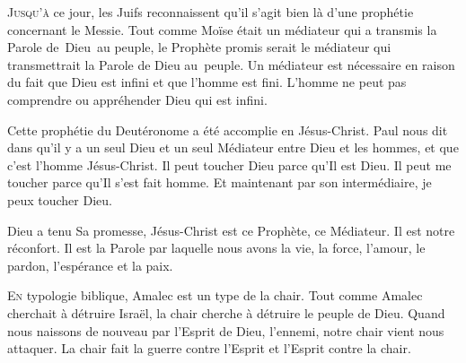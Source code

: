 \lettrine{J}{usqu'à} ce jour, les Juifs reconnaissent
 qu'il s'agit bien là d'une prophétie concernant le Messie.
 Tout comme Moïse était un médiateur qui a transmis la Parole de~Dieu~au peuple,
 le Prophète promis serait le médiateur qui transmettrait la Parole de Dieu
 au~peuple.
 Un médiateur est nécessaire en raison du fait que Dieu est infini
 et que l'homme est fini.
 L'homme ne peut pas comprendre ou appréhender Dieu qui est infini.


Cette prophétie du Deutéronome a été accomplie en Jésus-Christ.
 Paul nous dit dans  qu'il y a un seul Dieu
 et un seul Médiateur entre Dieu et les hommes,
 et que c'est l'homme Jésus-Christ. Il peut toucher Dieu parce qu'Il est Dieu.
 Il peut me toucher parce qu'Il s'est fait homme.
 Et maintenant par son intermédiaire, je peux toucher Dieu.

Dieu a tenu Sa promesse, Jésus-Christ est ce Prophète, ce Médiateur.
 Il est notre réconfort. Il est la Parole par laquelle nous avons la vie,
 la force, l'amour, le pardon, l'espérance et la paix. 

\dvrule






\lettrine{E}{n} typologie biblique, Amalec est un type
  de la chair.
 Tout comme Amalec cherchait à détruire Israël,
 la chair cherche à détruire le peuple de Dieu.
 Quand nous naissons de nouveau par l'Esprit de Dieu, l'ennemi,
 notre chair vient nous attaquer.
 La chair fait la guerre contre l'Esprit et l'Esprit contre la chair.

